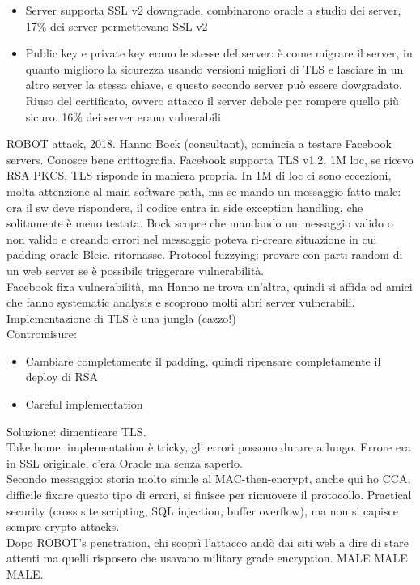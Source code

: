 \documentclass[16px]{article}
\begin{document}
\begin{itemize}
\item Server supporta SSL v2 downgrade, combinarono oracle a studio dei server, 17\% dei server permettevano SSL v2
\item Public key e private key erano le stesse del server: è come migrare il server, in quanto miglioro la sicurezza usando versioni migliori di TLS e lasciare in un altro server la stessa chiave, e questo secondo server può essere dowgradato. Riuso del certificato, ovvero attacco il server debole per rompere quello più sicuro. 16\% dei server erano vulnerabili 
\end{itemize}
ROBOT attack, 2018. Hanno Bock (consultant), comincia a testare Facebook servers. Conosce bene crittografia. Facebook supporta TLS v1.2, 1M loc, se ricevo RSA PKCS, TLS risponde in maniera propria. In 1M di loc ci sono eccezioni, molta attenzione al main software path, ma se mando un messaggio fatto male: ora il sw deve rispondere, il codice entra in side exception handling, che solitamente è meno testata. Bock scopre che mandando un messaggio valido o non valido e creando errori nel messaggio poteva ri-creare situazione in cui padding oracle Bleic. ritornasse. Protocol fuzzying: provare con parti random di un web server se è possibile  triggerare vulnerabilità.\\ Facebook fixa vulnerabilità, ma Hanno ne trova un'altra, quindi si affida ad amici che fanno systematic analysis e scoprono molti altri server vulnerabili. Implementazione di TLS è una jungla (cazzo!)\\ Contromisure:
\begin{itemize}
\item Cambiare completamente il padding, quindi ripensare completamente il deploy di RSA
\item Careful implementation
\end{itemize}
Soluzione: dimenticare TLS.\\ Take home: implementation è tricky, gli errori possono durare a lungo. Errore era in SSL originale, c'era Oracle ma senza saperlo.\\ Secondo messaggio: storia molto simile al MAC-then-encrypt, anche qui ho CCA, difficile fixare questo tipo di errori, si finisce per rimuovere il protocollo. Practical security (cross site scripting, SQL injection, buffer overflow), ma non si capisce sempre crypto attacks.\\ Dopo ROBOT's penetration, chi scoprì l'attacco andò dai siti web a dire di stare attenti ma quelli risposero che usavano military grade encryption. MALE MALE MALE.
\end{document}
